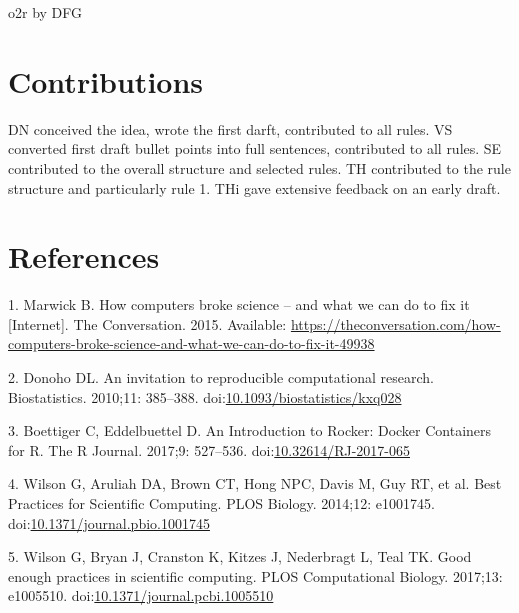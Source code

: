 \documentclass[10pt,letterpaper]{article}
\begin{document}
o2r by DFG

\hypertarget{contributions}{%
\section*{Contributions}\label{contributions}}

DN conceived the idea, wrote the first darft, contributed to all rules.
VS converted first draft bullet points into full sentences, contributed
to all rules. SE contributed to the overall structure and selected
rules. TH contributed to the rule structure and particularly rule 1. THi
gave extensive feedback on an early draft.

\hypertarget{references}{%
\section*{References}\label{references}}

\hypertarget{refs}{}
\leavevmode\hypertarget{ref-marwick_how_2015}{}%
1. Marwick B. How computers broke science -- and what we can do to fix
it {[}Internet{]}. The Conversation. 2015. Available:
\url{https://theconversation.com/how-computers-broke-science-and-what-we-can-do-to-fix-it-49938}

\leavevmode\hypertarget{ref-donoho_invitation_2010}{}%
2. Donoho DL. An invitation to reproducible computational research.
Biostatistics. 2010;11: 385--388.
doi:\href{https://doi.org/10.1093/biostatistics/kxq028}{10.1093/biostatistics/kxq028}

\leavevmode\hypertarget{ref-boettiger_introduction_2017}{}%
3. Boettiger C, Eddelbuettel D. An Introduction to Rocker: Docker
Containers for R. The R Journal. 2017;9: 527--536.
doi:\href{https://doi.org/10.32614/RJ-2017-065}{10.32614/RJ-2017-065}

\leavevmode\hypertarget{ref-wilson_best_2014}{}%
4. Wilson G, Aruliah DA, Brown CT, Hong NPC, Davis M, Guy RT, et al.
Best Practices for Scientific Computing. PLOS Biology. 2014;12:
e1001745.
doi:\href{https://doi.org/10.1371/journal.pbio.1001745}{10.1371/journal.pbio.1001745}

\leavevmode\hypertarget{ref-wilson_good_2017}{}%
5. Wilson G, Bryan J, Cranston K, Kitzes J, Nederbragt L, Teal TK. Good
enough practices in scientific computing. PLOS Computational Biology.
2017;13: e1005510.
doi:\href{https://doi.org/10.1371/journal.pcbi.1005510}{10.1371/journal.pcbi.1005510}
\end{document}
